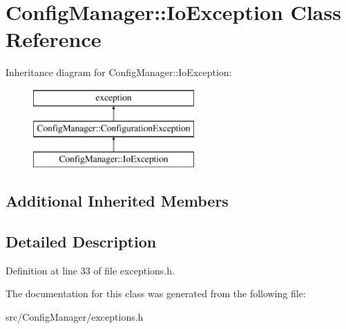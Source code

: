 \hypertarget{class_config_manager_1_1_io_exception}{}\section{Config\+Manager\+:\+:Io\+Exception Class Reference}
\label{class_config_manager_1_1_io_exception}
Inheritance diagram for Config\+Manager\+:\+:Io\+Exception\+:\begin{figure}[H]
\begin{center}
\leavevmode
\includegraphics[height=3.000000cm]{class_config_manager_1_1_io_exception}
\end{center}
\end{figure}
\subsection*{Additional Inherited Members}


\subsection{Detailed Description}


Definition at line 33 of file exceptions.\+h.



The documentation for this class was generated from the following file\+:\begin{DoxyCompactItemize}
\item 
src/\+Config\+Manager/exceptions.\+h\end{DoxyCompactItemize}
